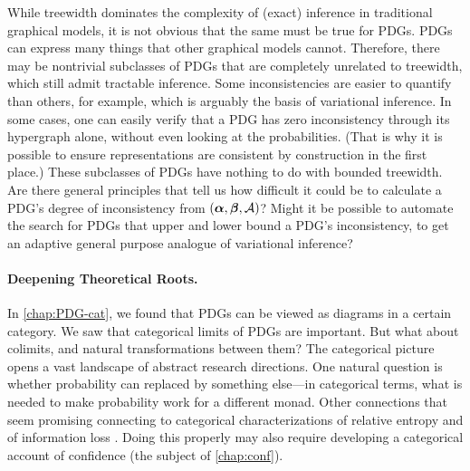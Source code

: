 While treewidth dominates the complexity of (exact) inference in traditional graphical models, it is not obvious that the same must be true for PDGs. 
PDGs can express many things that other graphical models cannot. 
Therefore, there may be nontrivial subclasses of PDGs that are completely unrelated to treewidth, which still admit tractable inference. 
%
Some inconsistencies are easier to quantify than others, for example,
    which is arguably the basis of variational inference.
In some cases, one can easily verify that a PDG has zero inconsistency through its hypergraph alone, without even looking at the probabilities.
(That is why it is possible to ensure representations are consistent by construction in the first place.)
These subclasses of PDGs have nothing to do with bounded treewidth. 
Are there general principles that tell us how difficult it could be to calculate a PDG's degree of inconsistency from $(\boldsymbol\alpha,\boldsymbol\beta,\mathcal A)$?
Might it be possible to automate the 
    search for PDGs that upper and lower bound a PDG's inconsistency,
    to get an adaptive general purpose analogue of variational inference?
    
\paragraph{Deepening Theoretical Roots.}
% 
\iffoundations
    In \cref{chap:PDG-cat}, we found that PDGs can be viewed as diagrams in a certain category. 
    We saw that categorical limits of PDGs are important. But what about colimits, and natural transformations between them? 
    The categorical picture opens a vast landscape of abstract research directions.
    One natural question is whether probability can replaced by something else---in categorical terms, what is needed to make probability work for a different monad.
    Other connections that seem promising connecting to categorical characterizations of relative entropy \citep{baez2014bayesiancharacterizationrelativeentropy} 
    and of information loss \citep[Theorem 12.4.9]{leinster2021entropy}.
    Doing this properly may also require developing a categorical account of confidence (the subject of \cref{chap:conf}). 
\else
    \TODO
\fi

